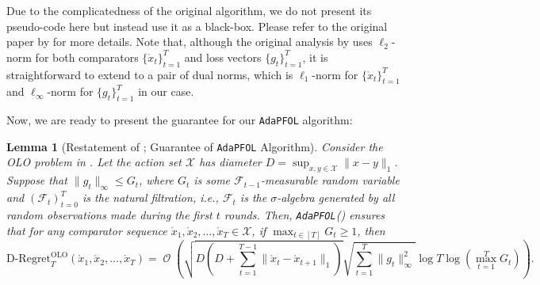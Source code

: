 \documentclass[11pt,fullpage,letterpaper]{article} %
\newtheorem{lemma}[theorem]{Lemma}
\renewcommand{\bm}[1]{#1}%
\renewcommand{\O}{\operatorname{\mathcal O}}
\newcommand{\OLOAlg}{\texttt{AdaPFOL}\xspace}
\begin{document}
Due to the complicatedness of the original algorithm, we do not present its pseudo-code here but instead use it as a black-box. Please refer to the original paper by \citet{cutkosky2020parameter} for more details. Note that, although the original analysis by \citet{cutkosky2020parameter} uses $\ell_2$-norm for both comparators $\{\mathring{\bm x}_t\}_{t=1}^T$ and loss vectors $\{\bm g_t\}_{t=1}^T$, it is straightforward to extend to a pair of dual norms, which is $\ell_1$-norm for $\{\mathring{\bm x}_t\}_{t=1}^T$ and $\ell_\infty$-norm for $\{\bm g_t\}_{t=1}^T$ in our case.

Now, we are ready to present the guarantee for our \OLOAlg algorithm:
\begin{lemma}[Restatement of ; Guarantee of \OLOAlg Algorithm]
Consider the OLO problem in . Let the action set $\mathcal X$ has diameter $D=\sup_{\bm x,\bm y\in \mathcal X}\lVert \bm x-\bm y\rVert_1$. Suppose that $\lVert \bm g_t\rVert_\infty\le G_t$, where $G_t$ is some $\mathcal F_{t-1}$-measurable random variable and $(\mathcal F_t)_{t=0}^T$ is the natural filtration, \textit{i.e.}, $\mathcal F_t$ is the $\sigma$-algebra generated by all random observations made during the first $t$ rounds.
Then, \OLOAlg () ensures that for any comparator sequence $\mathring{\bm x}_1,\mathring{\bm x}_2,\ldots,\mathring{\bm x}_T\in \mathcal X$, if $\max_{t\in [T]} G_t\ge 1$, then
\begin{equation*}
\text{D-Regret}_T^{\text{OLO}}(\mathring{\bm x}_1,\mathring{\bm x}_2,\ldots,\mathring{\bm x}_T)=\O\left (\sqrt{D \left (D+\sum_{t=1}^{T-1} \lVert \mathring{\bm x}_t-\mathring{\bm x}_{t+1}\rVert_1\right )}\sqrt{\sum_{t=1}^T \lVert \bm g_t\rVert_\infty^2}\log T \log \left (\max_{t=1}^T G_t\right )\right ).
\end{equation*}
\end{lemma}
\end{document}
